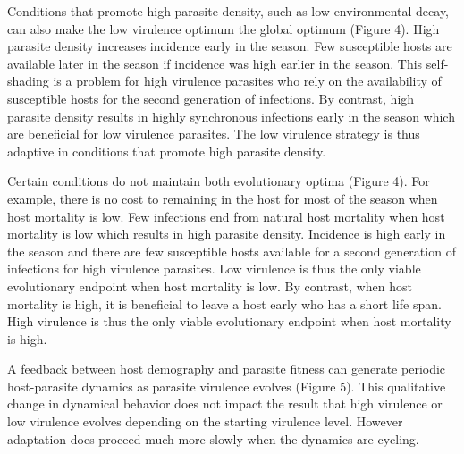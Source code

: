 \documentclass{article}
\begin{document}
Conditions that promote high parasite density, such as low environmental decay, can also make the low virulence optimum the global optimum (Figure 4). High parasite density increases incidence early in the season. Few susceptible hosts are available later in the season if incidence was high earlier in the season. This self-shading is a problem for high virulence parasites who rely on the availability of susceptible hosts for the second generation of infections. By contrast, high parasite density results in highly synchronous infections early in the season which are beneficial for low virulence parasites. The low virulence strategy is thus adaptive in conditions that promote high parasite density. 

Certain conditions do not maintain both evolutionary optima (Figure 4). For example, there is no cost to remaining in the host for most of the season when host mortality is low. Few infections end from natural host mortality when host mortality is low which results in high parasite density. Incidence is high early in the season and there are few susceptible hosts available for a second generation of infections for high virulence parasites. Low virulence is thus the only viable evolutionary endpoint when host mortality is low. By contrast, when host mortality is high, it is beneficial to leave a host early who has a short life span. High virulence is thus the only viable evolutionary endpoint when host mortality is high.

A feedback between host demography and parasite fitness can generate periodic host-parasite dynamics as parasite virulence evolves (Figure 5). This qualitative change in dynamical behavior does not impact the result that high virulence or low virulence evolves depending on the starting virulence level. However adaptation does proceed much more slowly when the dynamics are cycling. 
\end{document}
